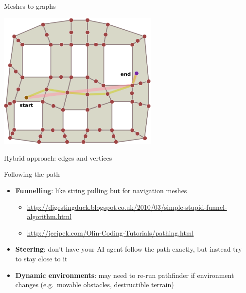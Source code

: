\begin{frame}{Meshes to graphs}
	\begin{center}
		\includegraphics[width=0.6\textwidth]{polygon-navmesh-edges-and-vertices}
		
		Hybrid approach: edges and vertices
	\end{center}
\end{frame}

\begin{frame}{Following the path}
	\begin{itemize}
		\pause\item \textbf{Funnelling}: like string pulling but for navigation meshes
			\begin{itemize}
				\pause\item \url{http://digestingduck.blogspot.co.uk/2010/03/simple-stupid-funnel-algorithm.html}
				\item \url{http://jceipek.com/Olin-Coding-Tutorials/pathing.html}
			\end{itemize}
		\pause\item \textbf{Steering}: don't have your AI agent follow the path exactly, but
			instead try to stay close to it
		\pause\item \textbf{Dynamic environments}: may need to re-run pathfinder if environment changes
			(e.g.\ movable obstacles, destructible terrain)
	\end{itemize}
\end{frame}

